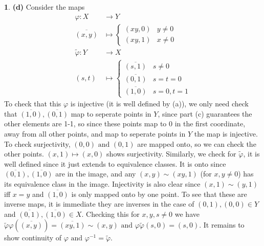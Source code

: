 \documentclass[10.5pt]{article}
\theoremstyle{definition}
\newtheorem{pb}{}
\newcommand{\tand}{\text{ and }}
\begin{document}
\begin{pb}
        \textbf{(d)} Consider the maps
        \begin{align*}
            \varphi: X &\to Y \\
            \overline{(x,y)} &\mapsto \begin{cases}
                (xy,0) & y \neq 0 \\ 
                (xy,1) & x \neq 0
            \end{cases} \\
            \tilde{\varphi}: Y &\to X \\
            (s,t) &\mapsto \begin{cases}
                \overline{(s,1)} & s \neq 0 \\
                \overline{(0,1)} & s = t = 0 \\
                \overline{(1,0)} & s=0, t=1
            \end{cases}
        \end{align*}
        To check that this \(\varphi\) is injective (it is well defined by (a)), we only need check that \(\overline{(1,0)}, \overline{(0,1)}\) map to seperate points in \(Y \), since part (c) guarantees
        the other elements are 1-1, so since these points map to \(0\) in the first coordinate, away from all other points, and map to seperate points in \(Y\) the map is injective.
        To check surjectivity, \((0,0) \tand (0,1)\) are mapped onto, so we can check the other points. \((x,1) \mapsto (x,0)\) shows surjectivity. Similarly, we check for \(\tilde{\varphi}\),
        it is well defined since it just extends to equivalence classes. It is onto since \(\overline{(0,1)}, \overline{(1,0)}\) are in the image, and any
        \((x,y) \sim (xy,1)\) (for \(x,y \neq 0\)) has its equivalence class in the image. Injectivity is also clear since \((x,1) \sim (y,1)\) iff \(x=y\) and \(\overline{(1,0)}\) is only mapped onto by one point.
        To see that these are inverse maps, it is immediate they are inverses in the case of \((0,1),(0,0) \in Y\) and \(\overline{(0,1)},\overline{(1,0)} \in X\).
        Checking this for \(x,y,s \neq 0\) we have \(\tilde{\varphi}\varphi(\overline{(x,y)}) = \overline{(xy,1)} \sim  (x,y) \tand \varphi \tilde{\varphi}(s,0) = (s,0)\). It remains to show continuity of
        \(\varphi \tand \varphi^{-1} = \tilde{\varphi}\).


\end{pb}
\end{document}
